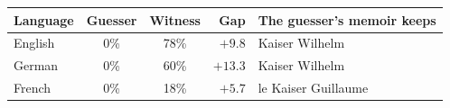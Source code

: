 \begin{tabular}{lccr p{3.2cm}}
\toprule
Language & Guesser & Witness & Gap & The guesser's memoir keeps \\
\midrule
English & 0\% & 78\% & $+9.8$ & Kaiser Wilhelm \\
German & 0\% & 60\% & $+13.3$ & Kaiser Wilhelm \\
French & 0\% & 18\% & $+5.7$ & le Kaiser Guillaume \\
\bottomrule
\end{tabular}